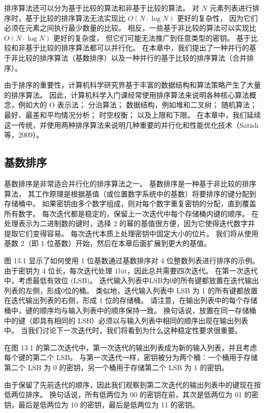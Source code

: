 排序算法还可以分为基于比较的算法和非基于比较的算法。 
对 $N$ 元素列表进行排序时，基于比较的排序算法无法实现比 $O(N \cdot \log N)$ 更好的复杂性，
因为它们必须在元素之间执行最少数量的比较。 相反，一些基于非比较的算法可以实现比 $O(N \cdot \log N)$ 更好的复杂度，
但它们可能无法推广到任意类型的密钥。 基于比较和非基于比较的排序算法都可以并行化。 
在本章中，我们提出了一种并行的基于非比较的排序算法（基数排序）以及一种并行的基于比较的排序算法（合并排序）。

由于排序的重要性，计算机科学研究界基于丰富的数据结构和算法策略产生了大量的排序算法。 
因此，计算机科学入门课经常使用排序算法来说明各种核心算法概念，例如大的 $\mathrm{O}$ 表示法； 
分治算法； 数据结构，例如堆和二叉树； 随机算法； 最好、最差和平均情况分析； 时空权衡； 以及上限和下限。 
在本章中，我们延续这一传统，并使用两种排序算法来说明几种重要的并行化和性能优化技术（Satish 等，2009）。

\subsection{基数排序}
基数排序是非常适合并行化的排序算法之一。 基数排序是一种基于非比较的排序算法，
其工作原理是根据基值（或位置数字系统中的基数）将要排序的键分配到存储桶中。 
如果密钥由多个数字组成，则对每个数字重复密钥的分配，直到覆盖所有数字。 
每次迭代都是稳定的，保留上一次迭代中每个存储桶内键的顺序。 
在处理表示为二进制数的键时，选择 2 的幂的基值很方便，因为它使得迭代数字并提取它们变得容易。 
每次迭代本质上处理密钥中固定大小的位片。 我们将从使用基数 2（即 1 位基数）开始，然后在本章后面扩展到更大的基值。

图 13.1 显示了如何使用 1 位基数通过基数排序对 4 位整数列表进行排序的示例。 
由于密钥为 4 位长，每次迭代处理 $1 \mathrm{bit}$，因此总共需要四次迭代。 在第一次迭代中，考虑最低有效位 (LSB)。 
迭代输入列表中LSB为0的所有键都放置在迭代输出列表的左侧，形成0位的桶。 
类似地，迭代输入列表中 LSB 为 1 的所有键都放置在迭代输出列表的右侧，形成 1 位的存储桶。 
请注意，在输出列表中的每个存储桶中，键的顺序均与输入列表中的顺序保持一致。 
换句话说，放置在同一存储桶中的键（即具有相同的 LSB）必须以与输入列表中相同的顺序出现在输出列表中。 
当我们讨论下一次迭代时，我们将看到为什么这种稳定性要求很重要。

在图 13.1 的第二次迭代中，第一次迭代的输出列表成为新的输入列表，并且考虑每个键的第二个 LSB。 
与第一次迭代一样，密钥被分为两个桶：一个桶用于存储第二个 LSB 为 0 的密钥，另一个桶用于存储第二个 LSB 为 1 的密钥。

由于保留了先前迭代的顺序，因此我们观察到第二次迭代的输出列表中的键现在按低两位排序。 
换句话说，所有低两位为 00 的密钥在前，其次是低两位为 01 的密钥，最后是低两位为 10 的密钥，最后是低两位为 11 的密钥。

